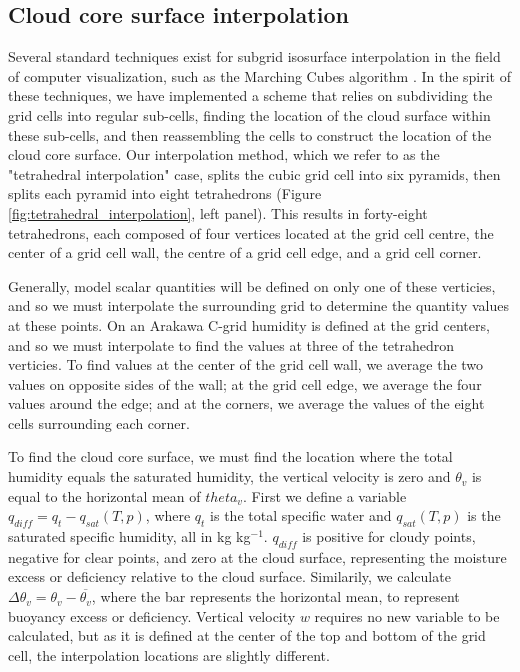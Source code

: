 \documentclass[12pt]{article}
\begin{document}

\subsection{Cloud core surface interpolation}

Several standard techniques exist for subgrid isosurface interpolation in the 
field of computer visualization, such as the Marching Cubes algorithm 
\citep{Lorensen1987}.  In the spirit of these techniques, we have implemented 
a scheme that relies on subdividing the grid cells into regular sub-cells, 
finding the location of the cloud surface within these sub-cells, and then 
reassembling the cells to construct the location of the cloud core surface.
Our interpolation method, which we refer to as the "tetrahedral interpolation"
case, splits the cubic grid cell into six pyramids, then splits each pyramid 
into eight tetrahedrons (Figure \ref{fig:tetrahedral_interpolation}, left 
panel).  This results in forty-eight tetrahedrons, each composed of four 
vertices located at the grid cell centre, the center of a grid cell wall, the 
centre of a grid cell edge, and a grid cell corner.

Generally, model scalar quantities will be defined on only one of these 
verticies, and so we must interpolate the surrounding grid to determine the 
quantity values at these points.  On an Arakawa C-grid humidity is defined 
at the grid centers, and so we must interpolate to find the values at three 
of the tetrahedron verticies.  To find values at the center of the grid cell 
wall, we average the two values on opposite sides of the wall; at the grid 
cell edge, we average the four values around the edge; and at the corners, 
we average the values of the eight cells surrounding each corner.

To find the cloud core surface, we must find the location where the total 
humidity equals the saturated humidity, the vertical velocity is zero and 
$\theta_v$ is equal to the horizontal mean of $theta_v$.  First we define a 
variable $q_{diff} = q_t - q_{sat}(T, p)$, where $q_t$ is the total specific 
water and $q_{sat}(T, p)$ is the saturated specific humidity, all in kg 
kg$^{-1}$.  $q_{diff}$ is positive for cloudy points, negative for clear 
points, and zero at the cloud surface, representing the moisture excess or 
deficiency relative to the cloud surface.  Similarily, we calculate $\Delta 
\theta_v = \theta_v - \overline{\theta_v}$, where the bar represents the 
horizontal mean, to represent buoyancy excess or deficiency.  Vertical 
velocity $w$ requires no new variable to be calculated, but as it is defined 
at the center of the top and bottom of the grid cell, the interpolation 
locations are slightly different.
\end{document}
